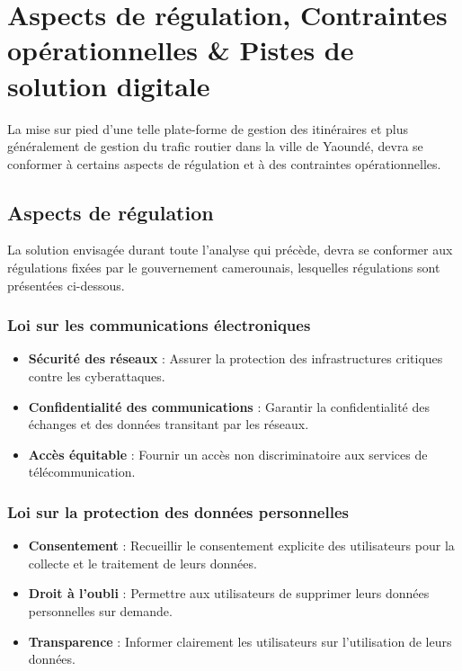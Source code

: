 \section{Aspects de régulation, Contraintes opérationnelles \& Pistes de solution digitale}

La mise sur pied d'une telle plate-forme de gestion des itinéraires et plus généralement de gestion du trafic routier dans la ville de Yaoundé, devra se conformer à certains aspects de régulation et à des contraintes opérationnelles.

\subsection{Aspects de régulation}

La solution envisagée durant toute l'analyse qui précède, devra se conformer aux régulations fixées par le gouvernement camerounais, lesquelles régulations sont présentées ci-dessous.

\subsubsection*{Loi sur les communications électroniques}

\begin{itemize}
  \item \textbf{Sécurité des réseaux} : Assurer la protection des infrastructures critiques contre les cyberattaques.
  \item \textbf{Confidentialité des communications} : Garantir la confidentialité des échanges et des données transitant par les réseaux.
  \item \textbf{Accès équitable} : Fournir un accès non discriminatoire aux services de télécommunication.
\end{itemize}

\subsubsection*{Loi sur la protection des données personnelles}
\begin{itemize}
  \item \textbf{Consentement} : Recueillir le consentement explicite des utilisateurs pour la collecte et le traitement de leurs données.
  \item \textbf{Droit à l'oubli} : Permettre aux utilisateurs de supprimer leurs données personnelles sur demande.
  \item \textbf{Transparence} : Informer clairement les utilisateurs sur l'utilisation de leurs données.
\end{itemize}

